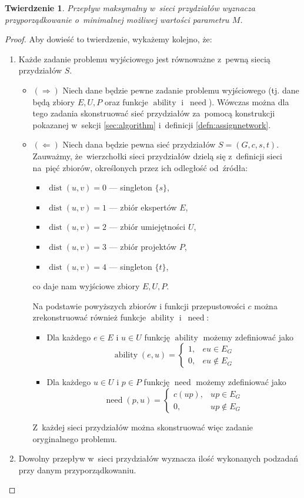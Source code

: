 \documentclass[12pt,a4paper]{article}
\newtheorem{thm}{Twierdzenie}
\theoremstyle{definition}
\DeclareMathOperator{\ability}{ability}
\DeclareMathOperator{\need}{need}
\DeclareMathOperator{\dist}{dist}
\begin{document}
\begin{thm}
Przepływ maksymalny w~sieci przydziałów wyznacza przyporządkowanie o~minimalnej
możliwej wartości parametru $M$. 
\end{thm}

\begin{proof}
Aby dowieść to twierdzenie, wykażemy kolejno, że:
\begin{enumerate}
	\item Każde zadanie problemu wyjściowego jest równoważne z~pewną siecią
	przydziałów $S$.
	\begin{itemize}
		\item $(\Rightarrow)$ Niech dane będzie pewne zadanie problemu
		wyjściowego (tj. dane będą zbiory $E,U,P$ oraz funkcje $\ability$
		i~$\need$). Wówczas można dla tego zadania skonstruować sieć przydziałów
		za~pomocą konstrukcji pokazanej w~sekcji \ref{sec:algorithm}
		i~definicji \ref{defn:assignnetwork}.
		\item $(\Leftarrow)$ Niech dana będzie pewna sieć przydziałów
		$S = (G,c,s,t)$. Zauważmy, że~wierzchołki sieci przydziałów dzielą się
		z~definicji sieci na~pięć zbiorów, określonych przez ich odległość
		od~źródła:
		\begin{itemize}
		\item $\dist(u,v) = 0$ --- singleton $\{s\}$,
			\item $\dist(u,v) = 1$ --- zbiór ekspertów $E$,
			\item $\dist(u,v) = 2$ --- zbiór umiejętności $U$,
			\item $\dist(u,v) = 3$ --- zbiór projektów $P$,
			\item $\dist(u,v) = 4$ --- singleton $\{t\}$,
		\end{itemize}
		co daje nam wyjściowe zbiory $E,U,P$.

		Na podstawie powyższych zbiorów i funkcji przepustowości $c$ można
		zrekonstruować również funkcje $\ability$ i~$\need$:
		\begin{itemize}
			\item Dla każdego $e \in E$ i $u \in U$ funkcję $\ability$ możemy
			zdefiniować jako
			$$ \ability(e, u) = \begin{cases}
				1, & eu \in E_G \\
				0, & eu \notin E_G
			\end{cases} $$
			\item Dla każdego $u \in U$ i $p \in P$ funkcję $\need$ możemy
			zdefiniować jako
			$$ \need(p, u) = \begin{cases}
				c(up), & up \in E_G \\
				0, & up \notin E_G
			\end{cases} $$
		\end{itemize}
		Z~każdej sieci przydziałów można skonstruować więc zadanie oryginalnego
		problemu. 
	\end{itemize}
	\item Dowolny przepływ w~sieci przydziałów wyznacza ilość wykonanych
	podzadań przy danym przyporządkowaniu.
	

\end{enumerate}
\end{proof}
\end{document}

